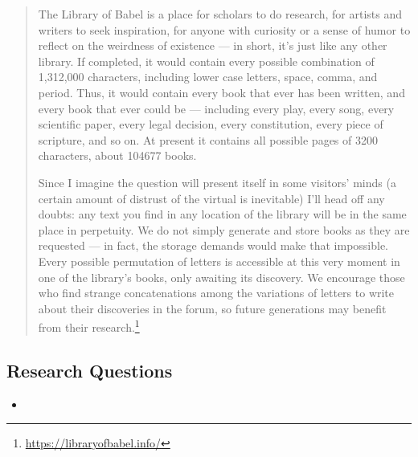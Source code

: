 \begin{quote}
  The Library of Babel is a place for scholars to do research, for artists and writers to seek inspiration, for anyone with curiosity or a sense of humor to reflect on the weirdness of existence --- in short, it’s just like any other library. If completed, it would contain every possible combination of 1,312,000 characters, including lower case letters, space, comma, and period. Thus, it would contain every book that ever has been written, and every book that ever could be --- including every play, every song, every scientific paper, every legal decision, every constitution, every piece of scripture, and so on. At present it contains all possible pages of 3200 characters, about 104677 books.

  Since I imagine the question will present itself in some visitors’ minds (a certain amount of distrust of the virtual is inevitable) I’ll head off any doubts: any text you find in any location of the library will be in the same place in perpetuity. We do not simply generate and store books as they are requested --- in fact, the storage demands would make that impossible. Every possible permutation of letters is accessible at this very moment in one of the library's books, only awaiting its discovery. We encourage those who find strange concatenations among the variations of letters to write about their discoveries in the forum, so future generations may benefit from their research.\footnote{\url{https://libraryofbabel.info/}}
\end{quote}

\subsection{Research Questions}

\begin{itemize}
  \item
\end{itemize}

